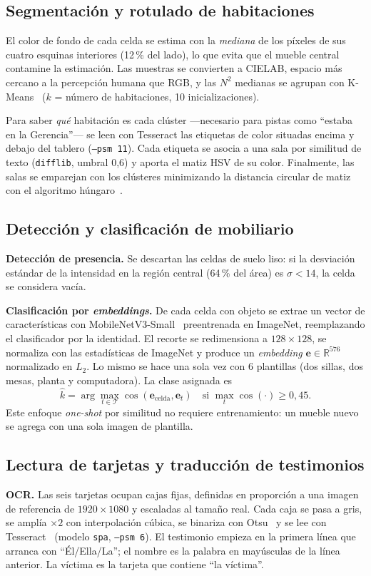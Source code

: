 \documentclass[conference,a4paper]{IEEEtran}
\begin{document}
\subsection{Segmentación y rotulado de habitaciones}
El color de fondo de cada celda se estima con la \emph{mediana} de los píxeles de sus
cuatro esquinas interiores (12\,\% del lado), lo que evita que el mueble central contamine
la estimación. Las muestras se convierten a CIELAB, espacio más cercano a la percepción
humana que RGB, y las $N^2$ medianas se agrupan con K-Means~\cite{lloyd1982}
($k$ = número de habitaciones, 10 inicializaciones).

Para saber \emph{qué} habitación es cada clúster ---necesario para pistas como ``estaba en la
Gerencia''--- se leen con Tesseract las etiquetas de color situadas encima y debajo del
tablero (\texttt{--psm 11}). Cada etiqueta se asocia a una sala por similitud de texto
(\texttt{difflib}, umbral 0,6) y aporta el matiz HSV de su color. Finalmente, las salas se
emparejan con los clústeres minimizando la distancia circular de matiz con el algoritmo
húngaro~\cite{kuhn1955}.

\subsection{Detección y clasificación de mobiliario}
\textbf{Detección de presencia.} Se descartan las celdas de suelo liso: si la desviación
estándar de la intensidad en la región central (64\,\% del área) es $\sigma<14$, la celda se
considera vacía.

\textbf{Clasificación por \emph{embeddings}.} De cada celda con objeto se extrae un vector
de características con MobileNetV3-Small~\cite{howard2019mobilenetv3} preentrenada en
ImageNet, reemplazando el clasificador por la identidad. El recorte se redimensiona a
$128\times128$, se normaliza con las estadísticas de ImageNet y produce un
\emph{embedding} $\mathbf{e}\in\mathbb{R}^{576}$ normalizado en $L_2$. Lo mismo se hace una
sola vez con 6 plantillas (dos sillas, dos mesas, planta y computadora). La clase asignada es
\begin{equation}
  \hat{k} = \arg\max_{t\in\mathcal{T}} \cos(\mathbf{e}_{\text{celda}},\mathbf{e}_t)
  \quad \text{si } \max_t \cos(\cdot) \geq 0{,}45 .
\end{equation}
Este enfoque \emph{one-shot} por similitud no requiere entrenamiento: un mueble nuevo se
agrega con una sola imagen de plantilla.

\subsection{Lectura de tarjetas y traducción de testimonios}
\textbf{OCR.} Las seis tarjetas ocupan cajas fijas, definidas en proporción a una imagen de
referencia de $1920\times1080$ y escaladas al tamaño real. Cada caja se pasa a gris, se
amplía $\times2$ con interpolación cúbica, se binariza con Otsu~\cite{otsu1979} y se lee con
Tesseract~\cite{smith2007tesseract} (modelo \texttt{spa}, \texttt{--psm 6}). El testimonio
empieza en la primera línea que arranca con ``Él/Ella/La''; el nombre es la palabra en
mayúsculas de la línea anterior. La víctima es la tarjeta que contiene ``la víctima''.
\end{document}
